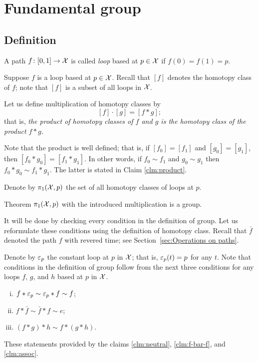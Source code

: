 \chapter{Fundamental group}

\section{Definition}

A path $f\colon[0,1]\to\mathcal{X}$ is called \emph{loop} based at $p\in\mathcal{X}$ if $f(0)=f(1)=p$.

Suppose $f$ is a loop based at $p\in \mathcal{X}$.
Recall that $[f]$ denotes the homotopy class of $f$; 
note that $[f]$ is a subset of all loops in $\mathcal{X}$.

Let us define multiplication of homotopy classes by 
\[[f]\cdot [g]=[f*g];\]
that is, \textit{the product of homotopy classes of $f$ and $g$ is the homotopy class of the product $f*g$.}

Note that the product is well defined;
that is, if $[f_0]= [f_1]$ and $[g_0]=[g_1]$, then  $[f_0*g_0]=[f_1*g_1]$.
In other words, if $f_0\sim f_1$ and $g_0\sim g_1$ then $f_0*g_0\sim f_1*g_1$.
The latter is stated in Claim \ref{clm:product}.

Denote by $\pi_1(\mathcal{X},p)$ the set of all homotopy classes of loops at $p$.

\begin{thm}{Theorem}
 $\pi_1(\mathcal{X},p)$ with the introduced multiplication is a group.
\end{thm}

It will be done by checking every condition in the definition of group.
Let us reformulate these conditions using the definition of homotopy class.
Recall that $\bar f$ denoted the path $f$ with revered time; see Section~\ref{sec:Operations on paths}.

Denote by $\varepsilon_p$ the constant loop at $p$ in $\mathcal{X}$;
that is, $\varepsilon_p(t)=p$ for any $t$.
Note that conditions in the definition of group follow from the next three conditions for any loops $f$, $g$, and $h$ based at $p$ in $\mathcal{X}$.
\begin{enumerate}[(i)]
\item $f*\varepsilon_p\sim \varepsilon_p*f\sim f$;
\item $f*\bar f\sim\bar f* f\sim e$;
\item $(f*g)*h\sim f*(g*h)$.
\end{enumerate}
These statements provided by the claims \ref{clm:neutral}, \ref{clm:f-bar-f}, and \ref{clm:assoc}.
\qeds
